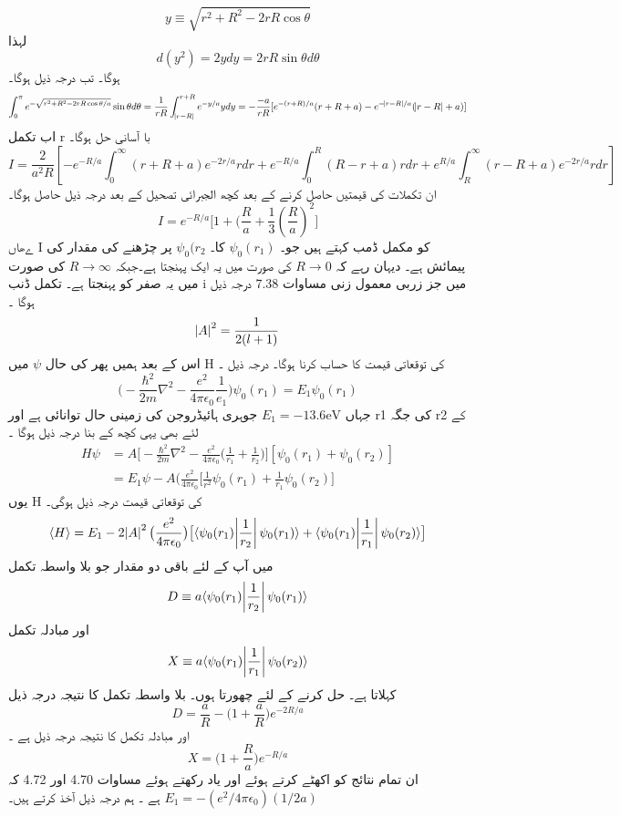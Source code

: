\documentclass{book}
\begin{document}
\[y\equiv\sqrt{r^{2}+R^{2}-2rR\cos{\theta}}\]
لہذا 
\[d(y^{2})=2ydy=2rR\sin{\theta}d\theta\]
ہوگا۔ تب درجہ ذیل ہوگا۔
\[\int_{0}^{\pi}e^{-\sqrt{r^{2}+R^{2}-2rR\cos{\theta/a}}}\sin{\theta}d\theta=\frac{1}{rR}\int_{\abs{r-R}}^{r+R}e^{-y/a}ydy=-\frac{-a}{rR}[e^{-(r+R)/a}(r+R+a)-e^{-\abs{r-R}/a}(\abs{r-R}+a)]\]
اب تکمل r با آسانی حل ہوگا۔ 
\[I=\frac{2}{a^{2}R}[-e^{-R/a}\int_{0}^{\infty}(r+R+a)e^{-2r/a}rdr+e^{-R/a}\int_{0}^{R}(R-r+a)rdr+e^{R/a}\int_{R}^{\infty}(r-R+a)e^{-2r/a}rdr]\]
ان تکملات کی قیمتیں حاصل کرنے کے بعد کچھ الجبرائی تصحیل کے بعد درجہ ذیل حاصل ہوگا۔
\[I=e^{-R/a}\big[1+(\frac{R}{a}+\frac{1}{3}(\frac{R}{a})^{2}\big]\]
ےھاں  ٰI کو مکمل ڈمب کہتے ہیں جو۔
\(\psi_{0}(r_{1})\)
 کا۔
 \(\psi_{0}(r_{2}\)
 پر چڑھنے کی مقدار کی پیمائش ہے۔ دیہان رہے کہ 
 \(R\rightarrow 0\)
  کی صورت میں یہ ایک پہنجتا ہے۔جبکہ 
  \(R\rightarrow \infty\)
   کی صورت میں یہ صفر کو پہنجتا ہے۔ تکمل ڈنب i میں جز زربی معمول زنی مساوات 7.38 درجہ ذیل ہوگا ۔\\
\[\abs{A}^{2}=\frac{1}{2(l+1)}\]
اس کے بعد ہمیں پھر کی حال 
\(\psi\)
 میں H کی توقعاتی قیمت کا حساب کرنا ہوگا۔ درجہ ذیل ۔
 \[\big(-\frac{\hbar^{2}}{2m}\nabla^{2}-\frac{e^{2}}{4\pi\epsilon_{0}}\frac{1}{e_{1}}\big)\psi_{0}(r_{1})=E_{1}\psi_{0}(r_{1})\]
  جہاں 
  \(E_{1}=-13.6\text{eV}\)
  جوہری ہائیڈروجن کی زمینی حال توانائی ہے اور r1 کی جگہ r2 کے لئے بھی یہی کچھ کے بنا  درجہ ذیل ہوگا ۔
\begin{align*}
H\psi&=A\big[-\frac{\hbar^{2}}{2m}\nabla^{2}-\frac{e^{2}}{4\pi\epsilon_{0}}\big(\frac{1}{r_{1}}+\frac{1}{r_{2}}\big)\big][\psi_{0}(r_{1})+\psi_{0}(r_{2})]\\
&=E_{1}\psi-A(\frac{e^{2}}{4\pi\epsilon_{0}}\big[\frac{1}{r^{2}}\psi_{0}(r_{1})+\frac{1}{r_{1}}\psi_{0}(r_{2})\big]
\end{align*}
یوں H کی توقعاتی قیمت درجہ ذیل ہوگی۔
\[\langle H \rangle =E_{1}-2\abs{A}^{2}\big(\frac{e^{2}}{4\pi\epsilon_{0}}\big)\big[\langle \psi_{0}(r_{1})\abs{\frac{1}{r_{2}}}\psi_{0}(r_{1})\rangle +\langle \psi_{0}(r_{1})\abs{\frac{1}{r_{1}}}\psi_{0}(r_{2})\rangle\big]\]
میں آپ کے لئے باقی دو مقدار جو بلا واسطہ تکمل 
\[D\equiv a\langle \psi_{0}(r_{1})\abs{\frac{1}{r_{2}}}\psi_{0}(r_{1})\rangle\]
اور
مبادلہ تکمل 
\[X\equiv a\langle\psi_{0}(r_{1})\abs{\frac{1}{r_{1}}}\psi_{0}(r_{2})\rangle\]
کہلاتا ہے۔ حل کرنے کے لئے چھورتا ہوں۔ بلا واسطہ تکمل کا نتیجہ درجہ ذیل 
\[D=\frac{a}{R}-\big(1+\frac{a}{R}\big)e^{-2R/a}\]
اور مبادلہ تکمل کا نتیجہ درجہ ذیل ہے ۔ 
\[X=\big(1+\frac{R}{a}\big)e^{-R/a}\]
ان تمام نتائج کو اکھٹے کرتے ہوئے اور یاد رکھتے ہوئے مساوات 4.70 اور 4.72 کہ 
\(E_{1}=-(e^{2}/4\pi\epsilon_{0})(1/2a)\)
ہے ۔ ہم درجہ ذیل آخذ کرتے ہیں۔
\end{document}
